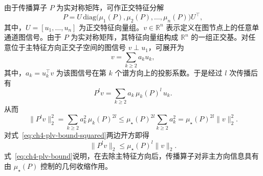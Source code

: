 由于传播算子 \(P\) 为实对称矩阵，可作正交特征分解
\begin{equation}
  P = U \,\mathrm{diag}\!\bigl(\mu_1(P),\mu_2(P),\dots,\mu_n(P)\bigr) U^\top,
  \label{eq:ch4-p-spectral}
\end{equation}
其中，\(U=[u_1,\dots,u_n]\) 为正交特征向量组。\(v\in\mathbb{R}^n\) 表示定义在图节点上的任意单通道图信号。由于 \(P\) 为实对称矩阵，其特征向量组构成 \(\mathbb{R}^n\) 的一组正交基。对任意位于主特征方向正交子空间的图信号 \(v\perp u_1\)，可展开为
\begin{equation}
  v=\sum_{k\ge 2} a_k u_k,
  \label{eq:ch4-v-expand}
\end{equation}
其中，\(a_k=u_k^\top v\) 为该图信号在第 \(k\) 个谱方向上的投影系数。于是经过 \(l\) 次传播后有
\begin{equation}
  P^l v=\sum_{k\ge 2} a_k\,\mu_k(P)^l\,u_k.
  \label{eq:ch4-plv-expand}
\end{equation}
从而
\begin{equation}
  \|P^l v\|_2^2
  =
  \sum_{k\ge 2} a_k^2\,\mu_k(P)^{2l}
  \le
  \mu_\star(P)^{2l}\sum_{k\ge 2} a_k^2
  =
  \mu_\star(P)^{2l}\|v\|_2^2.
  \label{eq:ch4-plv-bound-squared}
\end{equation}
对式~\eqref{eq:ch4-plv-bound-squared}两边开方即得
\begin{equation}
  \|P^l v\|_2 \le \mu_\star(P)^l \|v\|_2.
  \label{eq:ch4-plv-bound}
\end{equation}
式~\eqref{eq:ch4-plv-bound}说明，在去除主特征方向后，传播算子对非主方向信息具有由 \(\mu_\star(P)\) 控制的几何收缩作用。

